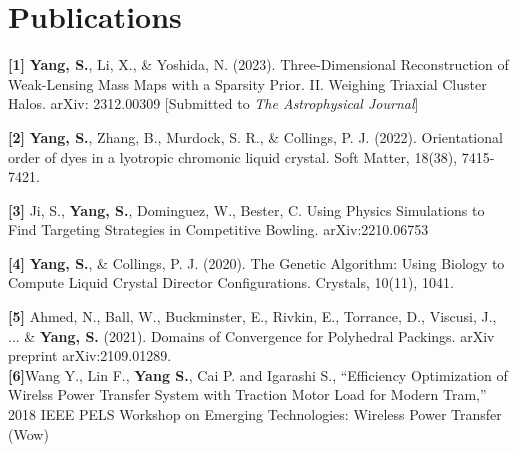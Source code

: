 \documentclass[letterpaper,11pt]{article}
\newcommand{\resumeSubHeadingListStart}{\begin{itemize}[leftmargin=0.15in, label={}]}
\newcommand{\resumeSubHeadingListEnd}{\end{itemize}}
\begin{document}
\section{Publications}
  \vspace{3pt}
  \resumeSubHeadingListStart
    \small{\item{
        \textbf{[1]}{ \textbf{Yang, S.}, Li, X., \& Yoshida, N. (2023). Three-Dimensional Reconstruction of Weak-Lensing Mass Maps with a Sparsity Prior. II. Weighing Triaxial Cluster Halos. arXiv: 2312.00309 [Submitted to \textit{The Astrophysical Journal}]}

    
        \textbf{[2]}{ \textbf{Yang, S.}, Zhang, B., Murdock, S. R., \& Collings, P. J. (2022). Orientational order of dyes in a lyotropic chromonic liquid crystal. Soft Matter, 18(38), 7415-7421. } \\ \vspace{3pt}

        \textbf{[3]}{ Ji, S., \textbf{Yang, S.}, Dominguez, W., Bester, C. Using Physics Simulations to Find Targeting Strategies in Competitive Bowling. arXiv:2210.06753}
        
        \textbf{[4]}{ \textbf{Yang, S.}, \& Collings, P. J. (2020). The Genetic Algorithm: Using Biology to Compute Liquid Crystal Director Configurations. Crystals, 10(11), 1041. } \\ \vspace{3pt}
    
        \textbf{[5]}{ Ahmed, N., Ball, W., Buckminster, E., Rivkin, E., Torrance, D., Viscusi, J., ... \& \textbf{Yang, S.} (2021). Domains of Convergence for Polyhedral Packings. arXiv preprint arXiv:2109.01289.} \\ \vspace{3pt}
        \textbf{[6]}Wang Y., Lin F., \textbf{Yang S.}, Cai P. and Igarashi S., ``Efficiency Optimization of Wirelss Power Transfer System with Traction Motor Load for Modern Tram,'' 2018 IEEE PELS Workshop on Emerging Technologies: Wireless Power Transfer (Wow)
        
        
        
        
    }}
  \resumeSubHeadingListEnd
  
\end{document}
